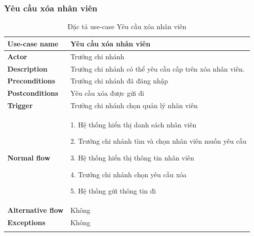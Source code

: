 \subsubsection{Yêu cầu xóa nhân viên}
{
    \setlength\extrarowheight{6pt}
    \begin{longtable}{| p{} | p{} |}
        \hline
        \textbf{Use-case name}
         &
        Yêu cầu xóa nhân viên
        \\
        \hline
        \textbf{Actor}
         &
        Trưởng chi nhánh
        \\
        \hline
        \textbf{Description}
         &
        Trưởng chi nhánh có thể yêu cầu cấp trên xóa nhân viên.
        \\
        \hline
        \textbf{Preconditions}
         &
        Trưởng chi nhánh đã đăng nhập
        \\
        \hline
        \textbf{Postconditions}
         &
        Yêu cầu xóa được gửi đi
        \\
        \hline
        \textbf{Trigger}
         &
        Trưởng chi nhánh chọn quản lý nhân viên
        \\
        \hline
        \begin{flushleft}
            \textbf{Normal flow}
        \end{flushleft}
         &
        1. Hệ thống hiển thị danh sách nhân viên

        2. Trưởng chi nhánh tìm và chọn nhân viên muốn yêu cầu

        3. Hệ thống hiển thị thông tin nhân viên

        4. Trưởng chi nhánh chọn yêu cầu xóa

        5. Hệ thống gửi thông tin đi
        \\
        \hline
        \textbf{Alternative flow}
         &
        Không
        \\
        \hline
        \textbf{Exceptions}
         &
        Không
        \\
        \hline
        \caption{Đặc tả use-case Yêu cầu xóa nhân viên}
    \end{longtable}
}

